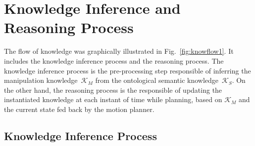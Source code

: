 \documentclass[twocolumn]{svjour3}          %
\begin{document}
\section{Knowledge Inference and Reasoning Process}\label{s-Knowledgeinference}

The flow of knowledge was graphically illustrated in Fig.~\ref{fig:knowflow1}. It includes the knowledge inference process and the reasoning process.
The knowledge inference process is the pre-processing step responsible of inferring the manipulation knowledge~$\mathcal{K}_M$ from the ontological semantic knowledge~$\mathcal{K}_S$. On the other hand, the reasoning process is the responsible of updating the instantiated knowledge at each instant of time while planning, based on $\mathcal{K}_M$ and the current state fed back by the motion planner.


\subsection{Knowledge Inference Process}\label{sec:prologinf}
\end{document}
